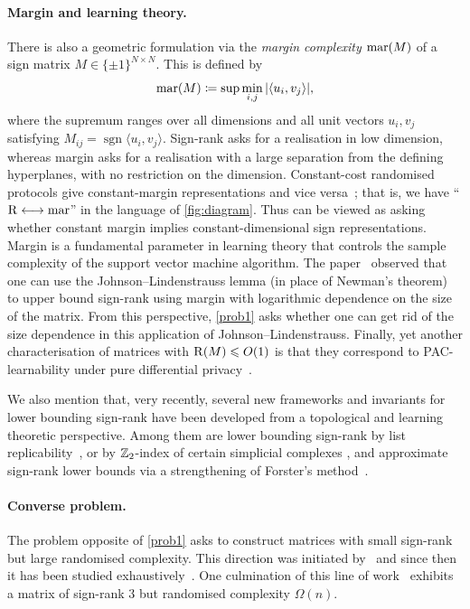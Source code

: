 \documentclass{article}
\begin{document}
\paragraph{Margin and learning theory.}
There is also a geometric formulation via the \emph{margin complexity} $\operatorname{mar}(M)$ of a sign matrix $M\in\{\pm1\}^{N\times N}$. This is defined by
\[
\operatorname{mar}(M) \coloneqq \sup \min_{i,j} |\langle u_i,v_j\rangle|,
\]
where the supremum ranges over all dimensions and all unit vectors $u_i,v_j$ satisfying $M_{ij}=\operatorname{sgn}\langle u_i,v_j\rangle$. Sign-rank asks for a realisation in low dimension, whereas margin asks for a realisation with a large separation from the defining hyperplanes, with no restriction on the dimension. Constant-cost randomised protocols give constant-margin representations and vice versa~\cite{LMSS07}; that is, we have ``$\operatorname{R}\longleftrightarrow\operatorname{mar}$'' in the language of \cref{fig:diagram}. Thus  can be viewed as asking whether constant margin implies constant-dimensional sign representations. Margin is a fundamental parameter in learning theory that controls the sample complexity of the support vector machine algorithm. The paper~\cite{LMSS07} observed that one can use the Johnson--Lindenstrauss lemma (in place of Newman's theorem) to upper bound sign-rank using margin with logarithmic dependence on the size of the matrix. From this perspective, \cref{prob1} asks whether one can get rid of the size dependence in this application of Johnson--Lindenstrauss. Finally, yet another characterisation of matrices with $\operatorname{R}(M)\leqslant O(1)$ is that they correspond to PAC-learnability under pure differential privacy~\cite{FX14, BNS19}.  

We also mention that, very recently, several new frameworks and invariants for lower bounding sign-rank have been developed from a topological and learning theoretic perspective. Among them are lower bounding sign-rank by list replicability~\cite{chornomaz2025spherical,BHHLT26a, BHHLT26b}, or by $\mathbb{Z}_2$-index of certain simplicial complexes \cite{FHV26, BHHLT26b}, and approximate sign-rank lower bounds via a strengthening of Forster's method~\cite{BHKR26}.

\paragraph{Converse problem.}
The problem opposite of \cref{prob1} asks to construct matrices with small sign-rank but large randomised complexity. This direction was initiated by~\cite{babai1986complexity} and since then it has been studied exhaustively~\cite{buhrman2007computation, sherstov2008halfspace, sherstov2011pattern, Sherstov2013, Thaler2016, sherstov2021hardest,HHL20,ACHS24}. One culmination of this line of work~\cite{HHL20,ACHS24} exhibits a matrix of sign-rank $3$ but randomised complexity $\Omega(n)$.
\end{document}

